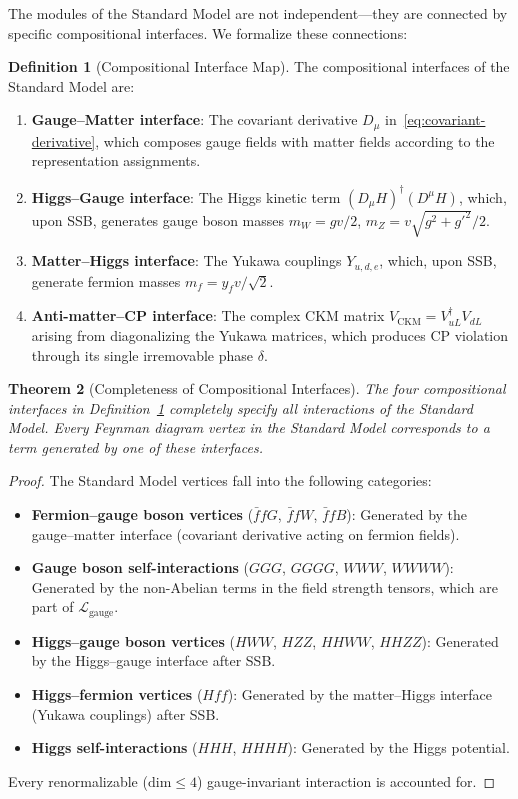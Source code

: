 \documentclass[12pt]{article}
\newtheorem{theorem}{Theorem}[section]
\theoremstyle{definition}
\newtheorem{definition}[theorem]{Definition}
\theoremstyle{remark}
\newcommand{\Lagr}{\mathcal{L}}
\begin{document}
The modules of the Standard Model are not independent---they are connected by specific compositional interfaces. We formalize these connections:

\begin{definition}[Compositional Interface Map]
\label{def:interface-map}
The compositional interfaces of the Standard Model are:
\begin{enumerate}
\item \textbf{Gauge--Matter interface}: The covariant derivative $D_\mu$ in~\eqref{eq:covariant-derivative}, which composes gauge fields with matter fields according to the representation assignments.
\item \textbf{Higgs--Gauge interface}: The Higgs kinetic term $(D_\mu H)^\dagger(D^\mu H)$, which, upon SSB, generates gauge boson masses $m_W = gv/2$, $m_Z = v\sqrt{g^2+g'^2}/2$.
\item \textbf{Matter--Higgs interface}: The Yukawa couplings $Y_{u,d,e}$, which, upon SSB, generate fermion masses $m_f = y_f v/\sqrt{2}$.
\item \textbf{Anti-matter--CP interface}: The complex CKM matrix $V_{\mathrm{CKM}} = V_{uL}^\dagger V_{dL}$ arising from diagonalizing the Yukawa matrices, which produces CP violation through its single irremovable phase $\delta$.
\end{enumerate}
\end{definition}

\begin{theorem}[Completeness of Compositional Interfaces]
\label{thm:completeness}
The four compositional interfaces in Definition~\ref{def:interface-map} completely specify all interactions of the Standard Model. Every Feynman diagram vertex in the Standard Model corresponds to a term generated by one of these interfaces.
\end{theorem}

\begin{proof}
The Standard Model vertices fall into the following categories:
\begin{itemize}
\item \textbf{Fermion--gauge boson vertices} ($\bar{f}fG$, $\bar{f}fW$, $\bar{f}fB$): Generated by the gauge--matter interface (covariant derivative acting on fermion fields).
\item \textbf{Gauge boson self-interactions} ($GGG$, $GGGG$, $WWW$, $WWWW$): Generated by the non-Abelian terms in the field strength tensors, which are part of $\Lagr_{\mathrm{gauge}}$.
\item \textbf{Higgs--gauge boson vertices} ($HWW$, $HZZ$, $HHWW$, $HHZZ$): Generated by the Higgs--gauge interface after SSB.
\item \textbf{Higgs--fermion vertices} ($Hff$): Generated by the matter--Higgs interface (Yukawa couplings) after SSB.
\item \textbf{Higgs self-interactions} ($HHH$, $HHHH$): Generated by the Higgs potential.
\end{itemize}
Every renormalizable ($\mathrm{dim} \leq 4$) gauge-invariant interaction is accounted for.
\end{proof}
\end{document}
